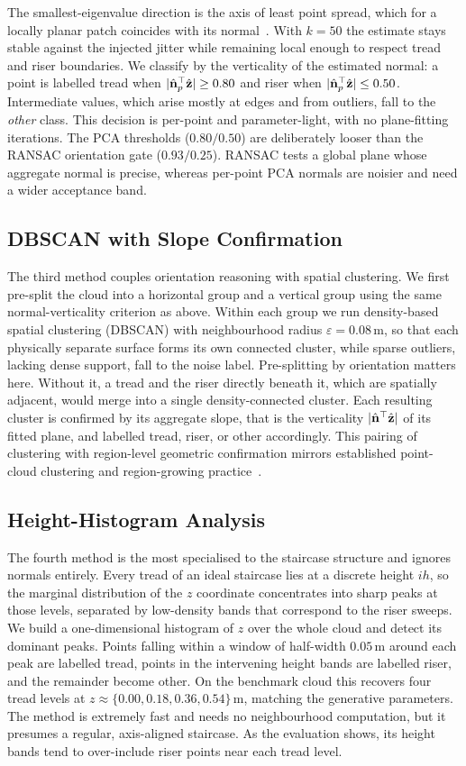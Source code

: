 The smallest-eigenvalue direction is the axis of least point spread, which for a
locally planar patch coincides with its normal~\cite{huang2009consolidation,castillo2013point}.
With $k=50$ the estimate stays stable against the injected jitter while remaining
local enough to respect tread and riser boundaries. We classify by the
verticality of the estimated normal: a point is labelled tread when
$|\hat{\mathbf{n}}_p^\top\hat{\mathbf{z}}|\ge 0.80$ and riser when $|\hat{\mathbf{n}}_p^\top\hat{\mathbf{z}}|\le 0.50$.
Intermediate values, which arise mostly at edges and from outliers, fall to the
\emph{other} class. This decision is per-point and parameter-light, with no
plane-fitting iterations. The PCA thresholds ($0.80/0.50$) are deliberately
looser than the RANSAC orientation gate ($0.93/0.25$). RANSAC tests a global
plane whose aggregate normal is precise, whereas per-point PCA normals are
noisier and need a wider acceptance band.

\subsection{DBSCAN with Slope Confirmation}
The third method couples orientation reasoning with spatial clustering. We first
pre-split the cloud into a horizontal group and a vertical group using the same
normal-verticality criterion as above. Within each group we run density-based
spatial clustering (DBSCAN) with neighbourhood radius $\varepsilon=0.08$\,m, so
that each physically separate surface forms its own connected cluster, while
sparse outliers, lacking dense support, fall to the noise label. Pre-splitting by
orientation matters here. Without it, a tread and the riser directly beneath it,
which are spatially adjacent, would merge into a single density-connected
cluster. Each resulting cluster is confirmed by its aggregate slope, that is the
verticality $|\hat{\mathbf{n}}^\top\hat{\mathbf{z}}|$ of its fitted plane, and labelled tread, riser, or
other accordingly. This pairing of clustering with region-level geometric
confirmation mirrors established point-cloud clustering and region-growing
practice~\cite{zhou2024identification,luo2021supervoxel}.

\subsection{Height-Histogram Analysis}
The fourth method is the most specialised to the staircase structure and ignores
normals entirely. Every tread of an ideal staircase lies at a discrete height
$ih$, so the marginal distribution of the $z$ coordinate concentrates into sharp
peaks at those levels, separated by low-density bands that correspond to the
riser sweeps. We build a one-dimensional histogram of $z$ over the whole cloud
and detect its dominant peaks. Points falling within a window of half-width
$0.05$\,m around each peak are labelled tread, points in the intervening height
bands are labelled riser, and the remainder become other. On the benchmark cloud
this recovers four tread levels at $z\approx\{0.00, 0.18, 0.36, 0.54\}$\,m,
matching the generative parameters. The method is extremely fast and needs no
neighbourhood computation, but it presumes a regular, axis-aligned staircase. As
the evaluation shows, its height bands tend to over-include riser points near
each tread level.

